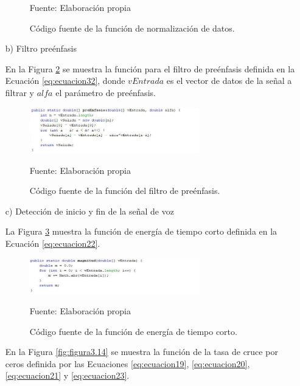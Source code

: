 \begin{enumerate}
\begin{figure}[H]
\begin{center}
\vskip -0.5cm
\caption{\small{Código fuente de la función de normalización de datos.}}
\label{fig:figura3.9}
{\small{Fuente: Elaboración propia}}
\end{center}
\end{figure}
\vskip -0.5cm
\item[b)]Filtro preénfasis
\par
En la Figura \ref{fig:figura3.10} se muestra la función para el filtro de preénfasis definida en la Ecuación \eqref{eq:ecuacion32}, donde $vEntrada$ es el vector de datos de la señal a filtrar y $alfa$ el parámetro de preénfasis.
\begin{figure}[H]
\captionsetup{justification=centering}
\begin{center}
\includegraphics[width=0.7\textwidth]{Imagenes/Cap3/image010}
\end{center}
\begin{center}
\vskip -0.5cm
\caption{\small{Código fuente de la función del filtro de preénfasis.}}
\label{fig:figura3.10}
{\small{Fuente: Elaboración propia}}
\end{center}
\end{figure}
\vskip -0.5cm
\item[c)]Detección de inicio y fin de la señal de voz
\par
La Figura \ref{fig:figura3.13} muestra la función de energía de tiempo corto definida en la Ecuación \eqref{eq:ecuacion22}.
\begin{figure}[H]
\captionsetup{justification=centering}
\begin{center}
\includegraphics[width=0.7\textwidth]{Imagenes/Cap3/image013}
\end{center}
\begin{center}
\vskip -0.5cm
\caption{\small{Código fuente de la función de energía de tiempo corto.}}
\label{fig:figura3.13}
{\small{Fuente: Elaboración propia}}
\end{center}
\end{figure}
\vskip -0.5cm
En la Figura \ref{fig:figura3.14} se muestra la función de la tasa de cruce por ceros definida por las Ecuaciones \eqref{eq:ecuacion19}, \eqref{eq:ecuacion20}, \eqref{eq:ecuacion21} y \eqref{eq:ecuacion23}.

\end{enumerate}
